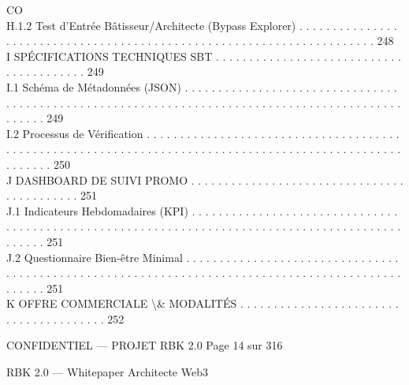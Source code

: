 \documentclass[12pt,landscape,a4paper]{article}
\newenvironment{confidential}
{\begin{tcolorbox}[
    colback=rbkred!5!white,
    colframe=rbkred!75!black,
    title=CONFIDENTIEL,
    fonttitle=\bfseries\color{white},
    coltitle=rbkred!75!black,
    breakable,
    enhanced,
    frame hidden,
    borderline west={2pt}{0pt}{rbkred!75!black}
]}
{\end{tcolorbox}}
\begin{document}
CO\\
H.1.2               Test d’Entrée Bâtisseur/Architecte (Bypass Explorer) . . . . . . . . . . . . . . . . . . . . . . . . . . . . . . . . . . . . . . . . . . . . . . . . . . . . . . . . . . . . . . . . . . . . . . 248\\
\vspace{0.5em}
I     SPÉCIFICATIONS TECHNIQUES SBT . . . . . . . . . . . . . . . . . . . . . . . . . . . . . . . . . . . . . . . . 249\\
I.1     Schéma de Métadonnées (JSON) . . . . . . . . . . . . . . . . . . . . . . . . . . . . . . . . . . . . . . . . . . . . . . . . . . . . . . . . . . . . . . . . . . . . . . . . . . . . . . . . . . . . . . . . . . . . . . . . . 249\\
I.2     Processus de Vérification . . . . . . . . . . . . . . . . . . . . . . . . . . . . . . . . . . . . . . . . . . . . . . . . . . . . . . . . . . . . . . . . . . . . . . . . . . . . . . . . . . . . . . . . . . . . . . . . . . . . . . . . 250\\
\vspace{0.5em}
J     DASHBOARD DE SUIVI PROMO . . . . . . . . . . . . . . . . . . . . . . . . . . . . . . . . . . . . . . . . . . . 251\\
J.1     Indicateurs Hebdomadaires (KPI) . . . . . . . . . . . . . . . . . . . . . . . . . . . . . . . . . . . . . . . . . . . . . . . . . . . . . . . . . . . . . . . . . . . . . . . . . . . . . . . . . . . . . . . . . . . . . . . . 251\\
J.2     Questionnaire Bien-être Minimal . . . . . . . . . . . . . . . . . . . . . . . . . . . . . . . . . . . . . . . . . . . . . . . . . . . . . . . . . . . . . . . . . . . . . . . . . . . . . . . . . . . . . . . . . . . . . . . . . 251\\
\vspace{0.5em}
K     OFFRE COMMERCIALE \textbackslash{}& MODALITÉS . . . . . . . . . . . . . . . . . . . . . . . . . . . . . . . . . . . . . . . 252\\
\vspace{0.5em}
\vspace{0.5em}
\begin{confidential}CONFIDENTIEL — PROJET RBK 2.0                                                                              Page 14 sur 316\end{confidential}
RBK 2.0 — Whitepaper Architecte Web3\\
\vspace{0.5em}
\vspace{0.5em}
\end{document}
